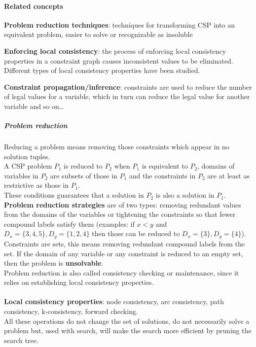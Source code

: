 \documentclass[10pt]{report}
\begin{document}
\paragraph{Related concepts} \begin{list}{}{}
	\item \textbf{Problem reduction techniques}: techniques for transforming CSP into an equivalent problem, easier to solve or recognizable as insoluble
	\item \textbf{Enforcing local consistency}: the process of enforcing local consistency properties in a constraint graph causes inconsistent values to be eliminated. Different types of local consistency properties have been studied.
	\item \textbf{Constraint propagation/inference}: constraints are used to reduce the number of legal values for a variable, which in turn can reduce the legal value for another variable and so on\ldots
\end{list}
\subparagraph{Problem reduction} Reducing a problem means removing those constraints which appear in no solution tuples.\\
A CSP problem $P_1$ is reduced to $P_2$ when $P_1$ is equivalent to $P_2$, domains of variables in $P_2$ are subsets of those in $P_1$ and the constraints in $P_2$ are at least as restrictive as those in $P_1$.\\
These conditions guarantees that a solution in $P_2$ is also a solution in $P_1$.\\
\textbf{Problem reduction strategies} are of two types: removing redundant values from the domains of the variables or tightening the constraints so that fewer compound labels satisfy them (examples: if $x < y$ and $D_x = \{3,4,5\}, D_y = \{1, 2,4\}$ then those can be reduced to $D_x=\{3\}, D_y=\{4\}$).\\
Constraints are sets, this means removing redundant compound labels from the set. If the domain of any variable or any constraint is reduced to an empty set, then the problem is \textbf{unsolvable}.\\
Problem reduction is also called consistency checking or maintenance, since it relies on establishing local consistency properties.\\\\
\textbf{Local consistency properties}: node consistency, arc consistency, path consistency, k-consistency, forward checking.\\
All these operations do not change the set of solutions, do not necessarily solve a problem but, used with search, will make the search more efficient by pruning the search tree.
\end{document}
